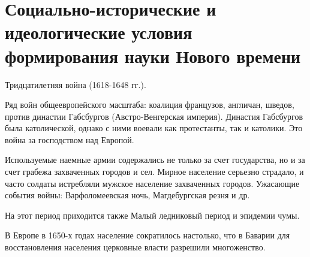 



\section{Социально-исторические и идеологические
условия формирования науки Нового времени}

Тридцатилетняя война (1618-1648 гг.). 

Ряд войн общеевропейского масштаба: коалиция французов, англичан, шведов, против династии Габсбургов (Австро-Венгерская империя).
Династия Габсбургов была католической, однако с ними воевали как протестанты, так и католики. Это война за господством над Европой.


Используемые наемные армии содержались не только за счет
государства, но и за счет грабежа захваченных городов и сел. Мирное население серьезно страдало, и часто солдаты истребляли мужское население захваченных городов. Ужасающие события войны:  Варфоломеевская ночь, Магдебургская
резня и др. 


На этот период приходится также Малый ледниковый период и эпидемии чумы.

В Европе в 1650-х годах население сократилось настолько,
что в Баварии для восстановления населения церковные власти разрешили многоженство. 

